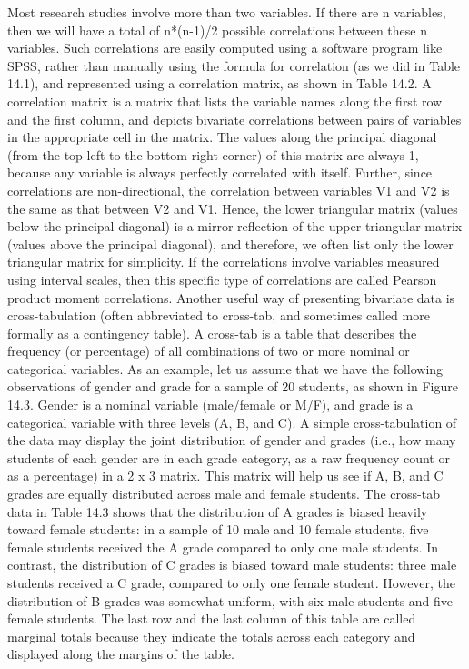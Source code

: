 Most research studies involve more than two variables. If there are n variables, then we will have a total of n*(n-1)/2 possible correlations between these n variables. Such correlations are easily computed using a software program like SPSS, rather than manually using the formula for correlation (as we did in Table 14.1), and represented using a correlation matrix, as shown in Table 14.2. A correlation matrix is a matrix that lists the variable names along the first row and the first column, and depicts bivariate correlations between pairs of variables in the appropriate cell in the matrix. The values along the principal diagonal (from the top left to the bottom right corner) of this matrix are always 1, because any variable is always perfectly correlated with itself. Further, since correlations are non-directional, the correlation between variables V1 and V2 is the same as that between V2 and V1. Hence, the lower triangular matrix (values below the principal diagonal) is a mirror reflection of the upper triangular matrix (values above the principal diagonal), and therefore, we often list only the lower triangular matrix for simplicity. If the correlations involve variables measured using interval scales, then this specific type of correlations are called Pearson product moment correlations. Another useful way of presenting bivariate data is cross-tabulation (often abbreviated to cross-tab, and sometimes called more formally as a contingency table). A cross-tab is a table that describes the frequency (or percentage) of all combinations of two or more nominal or categorical variables. As an example, let us assume that we have the following observations of gender and grade for a sample of 20 students, as shown in Figure 14.3. Gender is a nominal variable (male/female or M/F), and grade is a categorical variable with three levels (A, B, and C). A simple cross-tabulation of the data may display the joint distribution of gender and grades (i.e., how many students of each gender are in each grade category, as a raw frequency count or as a percentage) in a 2 x 3 matrix. This matrix will help us see if A, B, and C grades are equally distributed across male and female students. The cross-tab data in Table 14.3 shows that the distribution of A grades is biased heavily toward female students: in a sample of 10 male and 10 female students, five female students received the A grade compared to only one male students. In contrast, the distribution of C grades is biased toward male students: three male students received a C grade, compared to only one female student. However, the distribution of B grades was somewhat uniform, with six male students and five female students. The last row and the last column of this table are called marginal totals because they indicate the totals across each category and displayed along the margins of the table.

